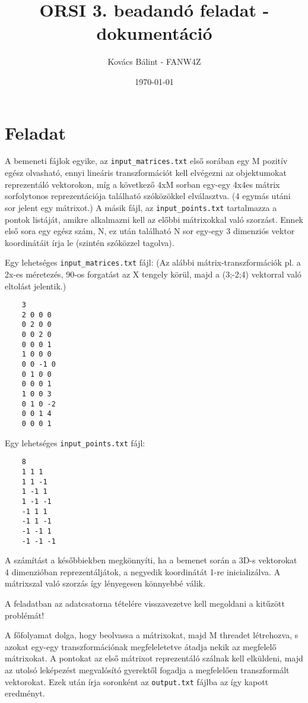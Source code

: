 \documentclass{article}
\begin{document}
	
	
	\title{ORSI 3. beadandó feladat - dokumentáció} 
	\author{Kovács Bálint - FANW4Z}  %
	\date{\today}  %
	\maketitle
	
	\section{Feladat}
	A bemeneti fájlok egyike, az \texttt{input\_matrices.txt} első sorában egy M pozitív egész olvasható, ennyi lineáris transzformációt kell elvégezni az objektumokat reprezentáló vektorokon, míg a következő 4xM sorban egy-egy 4x4es mátrix sorfolytonos reprezentációja található szóközökkel elválasztva. (4 egymás utáni sor jelent egy mátrixot.) A másik fájl, az \texttt{input\_points.txt} tartalmazza a pontok listáját, amikre alkalmazni kell az előbbi mátrixokkal való szorzást. Ennek első sora egy egész szám, N, ez után található N sor egy-egy 3 dimenziós vektor koordinátáit írja le (szintén szóközzel tagolva).
	
	Egy lehetséges \texttt{input\_matrices.txt} fájl: (Az alábbi mátrix-transzformációk pl. a 2x-es méretezés, 90-os forgatást az X tengely körül, majd a (3;-2;4) vektorral való eltolást jelentik.)
	
	\begin{verbatim}
	3
	2 0 0 0
	0 2 0 0
	0 0 2 0
	0 0 0 1
	1 0 0 0
	0 0 -1 0
	0 1 0 0
	0 0 0 1
	1 0 0 3
	0 1 0 -2
	0 0 1 4
	0 0 0 1
	\end{verbatim}
	Egy lehetséges \texttt{input\_points.txt} fájl:
	
	\begin{verbatim}
	8
	1 1 1
	1 1 -1
	1 -1 1
	1 -1 -1
	-1 1 1
	-1 1 -1
	-1 -1 1
	-1 -1 -1
	\end{verbatim}
	A számítást a későbbiekben megkönnyíti, ha a bemenet során a 3D-s vektorokat 4 dimenzióban reprezentáljátok, a negyedik koordinátát 1-re inicializálva. A mátrixszal való szorzás így lényegesen könnyebbé válik.
	
	A feladatban az adatcsatorna tételére visszavezetve kell megoldani a kitűzött problémát!
	
	A főfolyamat dolga, hogy beolvassa a mátrixokat, majd M threadet létrehozva, s azokat egy-egy transzformációnak megfeleletetve átadja nekik az megfelelő mátrixokat. A pontokat az első mátrixot reprezentáló szálnak kell elküldeni, majd az utolsó leképezést megvalósító gyerektől fogadja a megfelelően transzformált vektorokat. Ezek után írja soronként az \texttt{output.txt} fájlba az így kapott eredményt.
	
\end{document}
